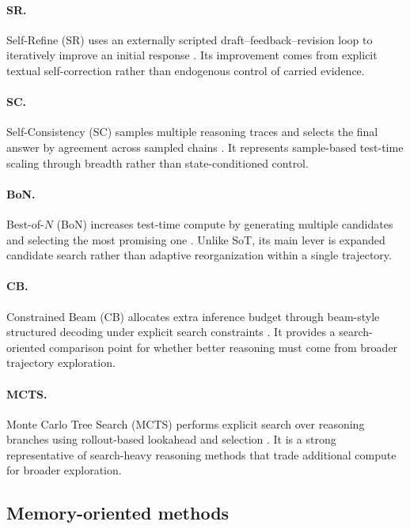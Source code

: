 \paragraph{\textbf{SR}.}
Self-Refine (SR) uses an externally scripted draft--feedback--revision loop to iteratively improve an initial response \citep{madaan2023self}.
Its improvement comes from explicit textual self-correction rather than endogenous control of carried evidence.

\paragraph{\textbf{SC}.}
Self-Consistency (SC) samples multiple reasoning traces and selects the final answer by agreement across sampled chains \citep{wang2023selfconsistency}.
It represents sample-based test-time scaling through breadth rather than state-conditioned control.

\paragraph{\textbf{BoN}.}
Best-of-\(N\) (BoN) increases test-time compute by generating multiple candidates and selecting the most promising one \citep{brown2024large,snell2024scaling}.
Unlike SoT, its main lever is expanded candidate search rather than adaptive reorganization within a single trajectory.

\paragraph{\textbf{CB}.}
Constrained Beam (CB) allocates extra inference budget through beam-style structured decoding under explicit search constraints \citep{hokamp2017lexically}.
It provides a search-oriented comparison point for whether better reasoning must come from broader trajectory exploration.

\paragraph{\textbf{MCTS}.}
Monte Carlo Tree Search (MCTS) performs explicit search over reasoning branches using rollout-based lookahead and selection \citep{xie2024mcts}.
It is a strong representative of search-heavy reasoning methods that trade additional compute for broader exploration.

\vspace{-1mm}
\subsection{Memory-oriented methods}
\vspace{-1mm}

